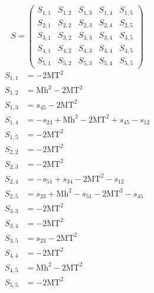 \documentclass[a4paper]{article}
\begin{document}
\begin{equation}
S=\left(\begin{array}{ccccc}
   S_{1,1}&
   S_{1,2}&
   S_{1,3}&
   S_{1,4}&
   S_{1,5}\\
   S_{2,1}&
   S_{2,2}&
   S_{2,3}&
   S_{2,4}&
   S_{2,5}\\
   S_{3,1}&
   S_{3,2}&
   S_{3,3}&
   S_{3,4}&
   S_{3,5}\\
   S_{4,1}&
   S_{4,2}&
   S_{4,3}&
   S_{4,4}&
   S_{4,5}\\
   S_{5,1}&
   S_{5,2}&
   S_{5,3}&
   S_{5,4}&
   S_{5,5}\end{array}\right)
\end{equation}
\begin{subequations}
\begin{align}
   S_{1,1}&=-2\text{MT}^2\\
   S_{1,2}&=\text{Mh}^2-2\text{MT}^2\\
   S_{1,3}&=s_{45}-2\text{MT}^2\\
   S_{1,4}&=-s_{23}+\text{Mh}^2-2\text{MT}^2+s_{45}-s_{12}\\
   S_{1,5}&=-2\text{MT}^2\\
   S_{2,2}&=-2\text{MT}^2\\
   S_{2,3}&=-2\text{MT}^2\\
   S_{2,4}&=-s_{51}+s_{34}-2\text{MT}^2-s_{12}\\
   S_{2,5}&=s_{23}+\text{Mh}^2-s_{51}-2\text{MT}^2-s_{45}\\
   S_{3,3}&=-2\text{MT}^2\\
   S_{3,4}&=-2\text{MT}^2\\
   S_{3,5}&=s_{23}-2\text{MT}^2\\
   S_{4,4}&=-2\text{MT}^2\\
   S_{4,5}&=\text{Mh}^2-2\text{MT}^2\\
   S_{5,5}&=-2\text{MT}^2
\end{align}
\end{subequations}
\end{document}

